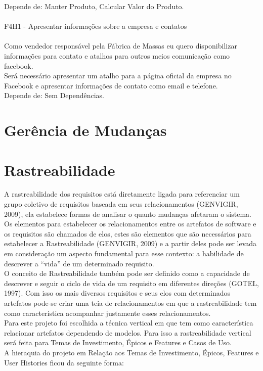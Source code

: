 \tab Depende de: Manter Produto, Calcular Valor do Produto.\\
\\
\tab F4H1 - Apresentar informações sobre a empresa e contatos\\
\\
\tab Como vendedor responsável pela Fábrica de Massas eu quero disponibilizar informações para contato e atalhos para outros meios comunicação como facebook.\\
\tab Será necessário apresentar um atalho para a página oficial da empresa no Facebook e apresentar informações de contato como email e telefone.\\
\tab Depende de: Sem Dependências.\\

\section{Gerência de Mudanças}
\section{Rastreabilidade}

A rastreabilidade dos requisitos está diretamente ligada para referenciar um grupo coletivo de requisitos baseada em seus relacionamentos (GENVIGIR, 2009), ela estabelece formas de analisar o quanto mudanças afetaram o sistema.
Os elementos para estabelecer os relacionamentos entre os artefatos de software e os requisitos são chamados de elos, estes são elementos que são necessários para estabelecer a Rastreabilidade (GENVIGIR, 2009) e a partir deles pode ser levada em consideração um aspecto fundamental para esse contexto: a habilidade de descrever a “vida” de um determinado requisito. \\
O conceito de Rastreabilidade também pode ser definido como a capacidade de descrever e seguir o ciclo de vida de um requisito em diferentes direções (GOTEL, 1997). Com isso os mais diversos requisitos e seus elos com determinados artefatos pode-se criar uma teia de relacionamentos em que a rastreabilidade tem como característica acompanhar justamente esses relacionamentos.\\
Para este projeto foi escolhida a técnica vertical em que tem como característica relacionar artefatos dependendo de modelos. Para isso a rastreabilidade vertical será feita para Temas de Investimento, Épicos e Features e Casos de Uso.\\

\tab A hieraquia do projeto em Relação aos Temas de Investimento, Épicos, Features e User Histories ficou da seguinte forma:\\

